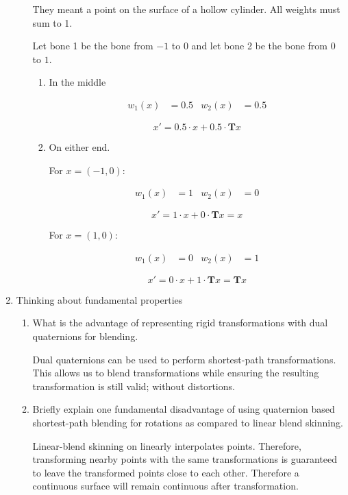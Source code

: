 \documentclass[10pt,\jkfside,a4paper]{article}
\begin{document}
\begin{enumerate}
\begin{enumerate}
{\color{blue} They meant a point on the surface of a hollow cylinder. All
weights must sum to 1.}

Let bone 1 be the bone from $-1$ to $0$ and let bone 2 be the bone from $0$
to $1$.

\begin{enumerate}

\item In the middle

\begin{align*}
w_1(x) &= 0.5 & w_2(x) &= 0.5
\end{align*}

\[
x' = 0.5 \cdot x + 0.5\cdot\mathbf{T}x
\]

\item On either end.

For $x = (-1, 0)$:

\begin{align}
w_1(x) &= 1 & w_2(x) &= 0
\end{align}

\[
x' = 1 \cdot x + 0\cdot\mathbf{T}x = x
\]

For $x = (1, 0)$:

\begin{align*}
w_1(x) &= 0 & w_2(x) &= 1
\end{align*}

\[
x' = 0 \cdot x + 1 \cdot \mathbf{T}x = \mathbf{T}x
\]

\end{enumerate}

\end{enumerate}

\item Thinking about fundamental properties

\begin{enumerate}

\item What is the advantage of representing rigid transformations with dual
quaternions for blending.

Dual quaternions can be used to perform shortest-path transformations. This
allows us to blend transformations while ensuring the resulting
transformation is still valid; without distortions.

\item Briefly explain one fundamental disadvantage of using quaternion based
shortest-path blending for rotations as compared to linear blend skinning.

Linear-blend skinning on linearly interpolates points. Therefore,
transforming nearby points with the same transformations is guaranteed to
leave the transformed points close to each other. Therefore a continuous
surface will remain continuous after transformation.


\end{enumerate}
\end{enumerate}
\end{document}
